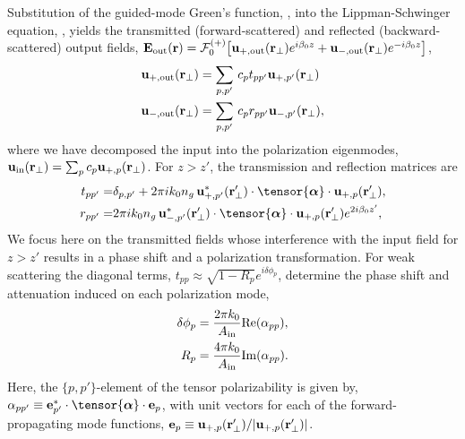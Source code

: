\documentclass[aps,pra,twocolumn]{revtex4-1} %
\newcommand{\out}{{\rm out}}
\newcommand{\fwd}{+}
\newcommand{\bwd}{-}
\newcommand{\trans}{+}
\newcommand{\refl}{-}
\newcommand{\Eamp}{\mathcal{F}_0^{(+)}}
\begin{document}
Substitution of the guided-mode Green's function, , into the Lippman-Schwinger equation, , yields the transmitted (forward-scattered) and reflected (backward-scattered) output fields, $\mathbf{E}_{\out}(\br) = \Eamp \big[ \mathbf{u}_{\trans, \out} (\br_\perp) e^{i \beta_0 z} + \mathbf{u}_{\refl,\out} (\br_\perp) e^{-i \beta_0 z} \big]$, 
	\begin{align}
		\mathbf{u}_{\trans, \out} (\br_\perp) &=  \sum_{p,p'}  \, c_{p} t_{pp'} \mathbf{u}_{\fwd, p'}(\br_\perp) \\ 
		\mathbf{u}_{\refl,\out} (\br_\perp) &=  \sum_{p,p'}  \, c_{p} r_{pp'} \mathbf{u}_{\bwd, p'}(\br_\perp),
	\end{align}
where we have decomposed the input into the polarization eigenmodes, $\mbf{u}_{\rm in}(\mbf{r}_\perp) = \sum_{p} c_{p} \mathbf{u}_{\fwd,p}(\br_\perp)$.  
For $z>z'$, the transmission and reflection matrices are 
	\begin{align} \label{Eq::PolarizationTransformation}
		t_{pp'} =& \delta_{p,p'} +  2\pi i k_0 n_g \, \mathbf{u}^*_{+, p'}(\br'_\perp) \cdot 
\tensor{\boldsymbol{\alpha}} \cdot \mathbf{u}_{+, p}(\br'_\perp) , \\
		r_{pp'} =&  2\pi i k_0 n_g \, \mathbf{u}^*_{\bwd, p'}(\br'_\perp) \cdot 
\tensor{\boldsymbol{\alpha}} \cdot \mathbf{u}_{\fwd, p}(\br'_\perp) e^{2 i\beta_0 z'} , 
	\end{align} 
We focus here on the transmitted fields whose interference with the input field for $z>z'$ results in a phase shift and a polarization transformation.  
For weak scattering the diagonal terms, $t_{p p} \approx \sqrt{1-R_p}e^{i \delta \phi_p}$, determine the phase shift and attenuation induced on each polarization mode,
	\begin{align}
		 \delta \phi_p &= \frac{2 \pi k_0}{A_{\rm in}} {\rm Re}(\alpha_{pp}),  \label{Eq::PhaseShift} \\
		R_p &=  \frac{4 \pi k_0}{A_{\rm in}} {\rm Im}(\alpha_{pp}) .\label{Eq::Attenuation} 
	\end{align} 
Here, the $\{p,p'\}$-element of the tensor polarizability is given by, $\alpha_{pp'} \equiv \mathbf{e}^*_{p'} \cdot \tensor{\boldsymbol{\alpha}}\cdot \mathbf{e}_{p}$, with unit vectors for each of the forward-propagating mode functions, $\mathbf{e}_{p}\equiv \mathbf{u}_{+,p}(\mathbf{r}'_\perp)/|\mathbf{u}_{+,p}(\mathbf{r}'_\perp)|$. 
\end{document}
